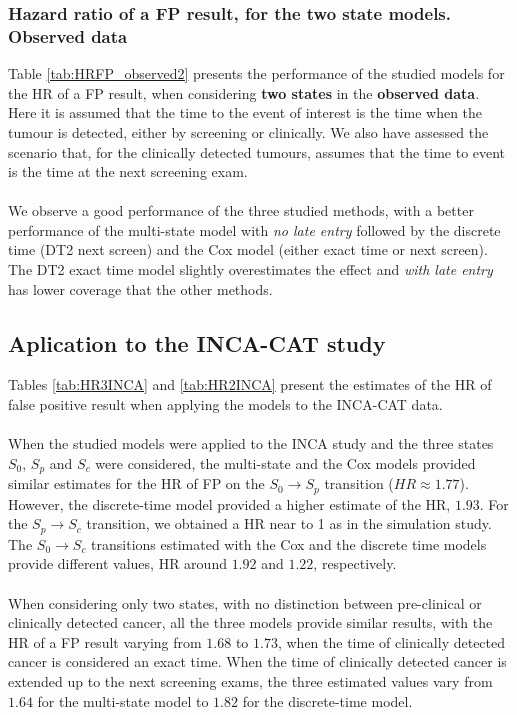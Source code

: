 \subsubsection{Hazard ratio of a FP result, for the two state models. Observed data}
Table \ref{tab:HRFP_observed2} presents the performance of the studied models for the HR of a FP
result, when considering \textbf{two states} in the \textbf{observed data}. Here it is assumed that
the time to the event of interest is the time when the tumour is detected, either by screening or
clinically. We also have assessed the scenario that, for the clinically detected tumours, assumes
that the time to event is the time at the next screening exam. 

\paragraph{}We observe a good performance of the three studied methods, with a better performance
of the multi-state model with \textit{no late entry} followed by the discrete time (DT2 next
screen) and the Cox model (either exact time or next screen). The DT2 exact time model slightly
overestimates the effect and \textit{with late entry} has lower coverage that the other methods. 

\subsection{Aplication to the INCA-CAT study}
Tables \ref{tab:HR3INCA} and \ref{tab:HR2INCA} present the estimates of the HR of false positive
result when applying the models to the INCA-CAT data. 

\paragraph{}When the studied models were applied to the INCA study and the three states $S_0$,
$S_p$ and $S_c$ were considered, the multi-state and the Cox models provided similar estimates for
the HR of FP on the $S_0 \rightarrow S_p$ transition ($HR \approx 1.77$).  However, the
discrete-time model provided a higher estimate of the HR, $1.93$. For the $S_p \rightarrow S_c$
transition, we obtained a HR near to 1 as in the simulation study. The $S_0 \rightarrow S_c$
transitions estimated with the Cox and the discrete time models provide different values, HR around
$1.92$ and $1.22$, respectively.

\paragraph{}When considering only two states, with no distinction between pre-clinical or
clinically detected cancer, all the three models provide similar results, with the HR of a FP
result varying from $1.68$ to $1.73$, when the time of clinically detected cancer is considered an
exact time. When the time of clinically detected cancer is extended up to the next screening exams,
the three estimated values vary from $1.64$ for the multi-state model to $1.82$ for the
discrete-time model.